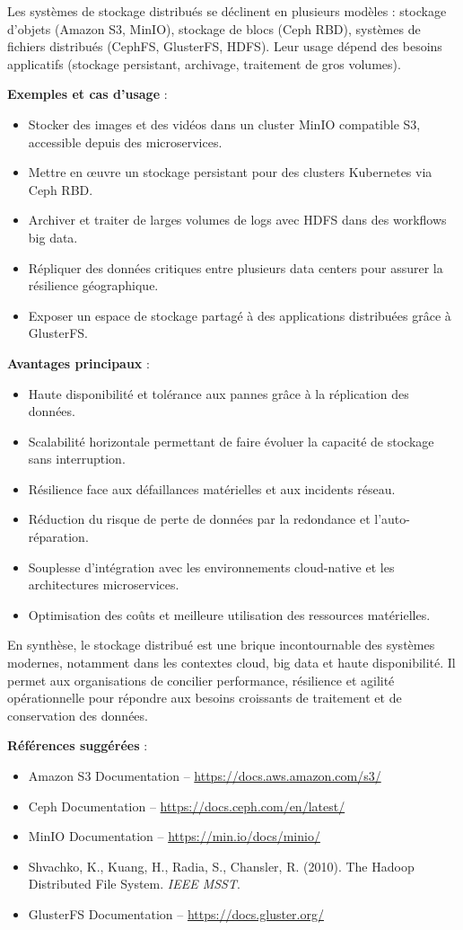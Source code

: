Les systèmes de stockage distribués se déclinent en plusieurs modèles  : stockage d’objets (Amazon S3, MinIO), stockage de blocs (Ceph RBD), systèmes de fichiers distribués (CephFS, GlusterFS, HDFS). Leur usage dépend des besoins applicatifs (stockage persistant, archivage, traitement de gros volumes).

\textbf{Exemples et cas d’usage} :
\begin{itemize}
	\item Stocker des images et des vidéos dans un cluster MinIO compatible S3, accessible depuis des microservices.
	\item Mettre en œuvre un stockage persistant pour des clusters Kubernetes via Ceph RBD.
	\item Archiver et traiter de larges volumes de logs avec HDFS dans des workflows big data.
	\item Répliquer des données critiques entre plusieurs data centers pour assurer la résilience géographique.
	\item Exposer un espace de stockage partagé à des applications distribuées grâce à GlusterFS.
\end{itemize}

\textbf{Avantages principaux} :
\begin{itemize}
	\item Haute disponibilité et tolérance aux pannes grâce à la réplication des données.
	\item Scalabilité horizontale permettant de faire évoluer la capacité de stockage sans interruption.
	\item Résilience face aux défaillances matérielles et aux incidents réseau.
	\item Réduction du risque de perte de données par la redondance et l’auto-réparation.
	\item Souplesse d’intégration avec les environnements cloud-native et les architectures microservices.
	\item Optimisation des coûts et meilleure utilisation des ressources matérielles.
\end{itemize}

En synthèse, le stockage distribué est une brique incontournable des systèmes modernes, notamment dans les contextes cloud, big data et haute disponibilité. Il permet aux organisations de concilier performance, résilience et agilité opérationnelle pour répondre aux besoins croissants de traitement et de conservation des données.

\textbf{Références suggérées} :
\begin{itemize}
	\item Amazon S3 Documentation – \url{https://docs.aws.amazon.com/s3/}
	\item Ceph Documentation – \url{https://docs.ceph.com/en/latest/}
	\item MinIO Documentation – \url{https://min.io/docs/minio/}
	\item Shvachko, K., Kuang, H., Radia, S., Chansler, R. (2010). The Hadoop Distributed File System. \textit{IEEE MSST}.
	\item GlusterFS Documentation – \url{https://docs.gluster.org/}
\end{itemize}

